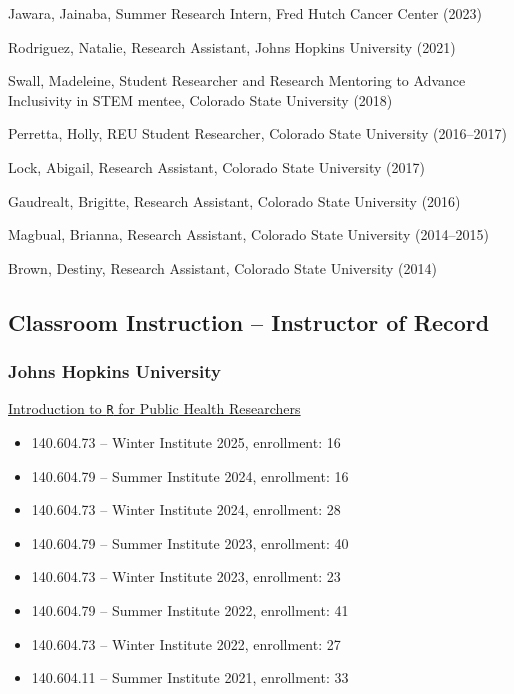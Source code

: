 \documentclass{cv}
\begin{document}
Jawara, Jainaba, Summer Research Intern, Fred Hutch Cancer Center (2023)

Rodriguez, Natalie, Research Assistant, Johns Hopkins University (2021)

Swall, Madeleine, Student Researcher and Research Mentoring to Advance Inclusivity in STEM mentee, Colorado State University (2018)

Perretta, Holly, REU Student Researcher, Colorado State University (2016--2017)

Lock, Abigail, Research Assistant, Colorado State University (2017)

Gaudrealt, Brigitte, Research Assistant, Colorado State University (2016)

Magbual, Brianna, Research Assistant, Colorado State University (2014--2015)

Brown, Destiny, Research Assistant, Colorado State University (2014)

\subsection*{Classroom Instruction -- Instructor of Record}

\subsubsection*{Johns Hopkins University}

\href{https://jhudatascience.org/intro_to_R/}{Introduction to \texttt{R} for Public Health Researchers}

\begin{itemize}

\item 140.604.73 -- Winter Institute 2025, enrollment: 16

\item 140.604.79 -- Summer Institute 2024, enrollment: 16

\item 140.604.73 -- Winter Institute 2024, enrollment: 28

\item 140.604.79 -- Summer Institute 2023, enrollment: 40

\item 140.604.73 -- Winter Institute 2023, enrollment: 23

\item 140.604.79  -- Summer Institute 2022, enrollment: 41

\item 140.604.73 -- Winter Institute 2022, enrollment: 27

\item 140.604.11 -- Summer Institute 2021, enrollment: 33

\end{itemize}
\end{document}
